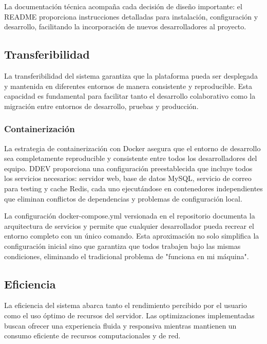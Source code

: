 \documentclass[12pt,a4paper,oneside]{report}
\begin{document}
La documentación técnica acompaña cada decisión de diseño importante: el README proporciona instrucciones detalladas para instalación, configuración y desarrollo, facilitando la incorporación de nuevos desarrolladores al proyecto.

\subsection{Transferibilidad}\label{transferibilidad}

La transferibilidad del sistema garantiza que la plataforma pueda ser desplegada y mantenida en diferentes entornos de manera consistente y reproducible. Esta capacidad es fundamental para facilitar tanto el desarrollo colaborativo como la migración entre entornos de desarrollo, pruebas y producción.

\subsubsection{Containerización}\label{containerizaciuxf3n}

La estrategia de containerización con Docker asegura que el entorno de desarrollo sea completamente reproducible y consistente entre todos los desarrolladores del equipo. DDEV proporciona una configuración preestablecida que incluye todos los servicios necesarios: servidor web, base de datos MySQL, servicio de correo para testing y cache Redis, cada uno ejecutándose en contenedores independientes que eliminan conflictos de dependencias y problemas de configuración local.

La configuración docker-compose.yml versionada en el repositorio documenta la arquitectura de servicios y permite que cualquier desarrollador pueda recrear el entorno completo con un único comando. Esta aproximación no solo simplifica la configuración inicial sino que garantiza que todos trabajen bajo las mismas condiciones, eliminando el tradicional problema de "funciona en mi máquina".

\subsection{Eficiencia}\label{eficiencia}

La eficiencia del sistema abarca tanto el rendimiento percibido por el usuario como el uso óptimo de recursos del servidor. Las optimizaciones implementadas buscan ofrecer una experiencia fluida y responsiva mientras mantienen un consumo eficiente de recursos computacionales y de red.
\end{document}
